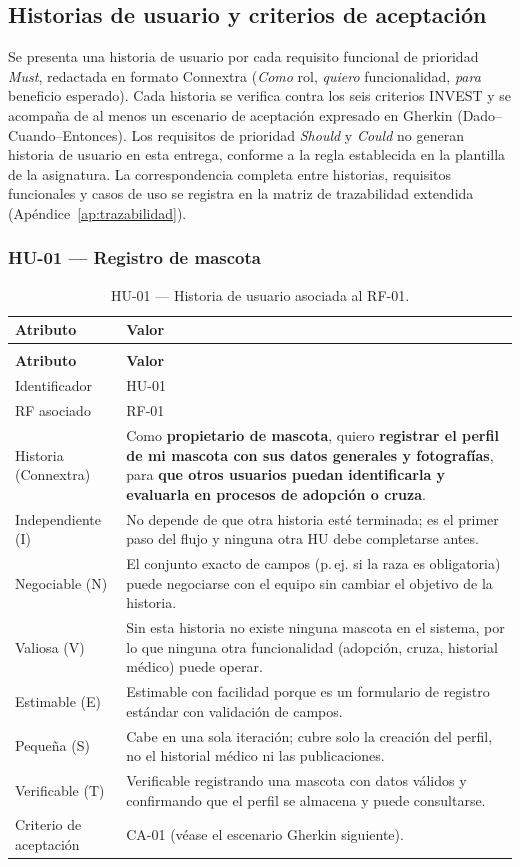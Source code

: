 \documentclass[journal,onecolumn]{IEEEtran}
\makeatletter
\newenvironment{atributos}[2]{%
	\small
	\begin{longtable}{@{}>{\raggedright\arraybackslash}p{4.2cm} >{\raggedright\arraybackslash}p{11.2cm}@{}}
		\caption{#2}\label{tab:#1}\\
		\toprule
		\textbf{Atributo} & \textbf{Valor} \\
		\midrule
		\endfirsthead
		\multicolumn{2}{@{}l}{\small\itshape (continuación)}\\
		\toprule
		\textbf{Atributo} & \textbf{Valor} \\
		\midrule
		\endhead
		\bottomrule
		\endlastfoot
	}{%
	\end{longtable}
	\normalsize
}
\makeatother
\begin{document}
	
	\subsection{Historias de usuario y criterios de aceptación}
	\label{sec:historias}
	
	Se presenta una historia de usuario por cada requisito funcional de prioridad
	\emph{Must}, redactada en formato Connextra (\emph{Como} rol, \emph{quiero}
	funcionalidad, \emph{para} beneficio esperado). Cada historia se verifica contra
	los seis criterios INVEST \cite{cohn2004} y se acompaña de al menos un
	escenario de aceptación expresado en Gherkin (Dado--Cuando--Entonces). Los
	requisitos de prioridad \emph{Should} y \emph{Could} no generan historia de
	usuario en esta entrega, conforme a la regla establecida en la plantilla de la
	asignatura. La correspondencia completa entre historias, requisitos funcionales
	y casos de uso se registra en la matriz de trazabilidad extendida
	(Apéndice~\ref{ap:trazabilidad}).
	
	\subsubsection{HU-01 --- Registro de mascota}
	
	\begin{atributos}{HU-01}{HU-01 --- Historia de usuario asociada al RF-01.}
		Identificador & HU-01 \\
		RF asociado & RF-01 \\
		Historia (Connextra) & Como \textbf{propietario de mascota}, quiero \textbf{registrar el perfil de mi mascota con sus datos generales y fotografías}, para \textbf{que otros usuarios puedan identificarla y evaluarla en procesos de adopción o cruza}. \\
		Independiente (I) & No depende de que otra historia esté terminada; es el primer paso del flujo y ninguna otra HU debe completarse antes. \\
		Negociable (N) & El conjunto exacto de campos (p.\,ej. si la raza es obligatoria) puede negociarse con el equipo sin cambiar el objetivo de la historia. \\
		Valiosa (V) & Sin esta historia no existe ninguna mascota en el sistema, por lo que ninguna otra funcionalidad (adopción, cruza, historial médico) puede operar. \\
		Estimable (E) & Estimable con facilidad porque es un formulario de registro estándar con validación de campos. \\
		Pequeña (S) & Cabe en una sola iteración; cubre solo la creación del perfil, no el historial médico ni las publicaciones. \\
		Verificable (T) & Verificable registrando una mascota con datos válidos y confirmando que el perfil se almacena y puede consultarse. \\
		Criterio de aceptación & CA-01 (véase el escenario Gherkin siguiente). \\
	\end{atributos}
	
\end{document}
